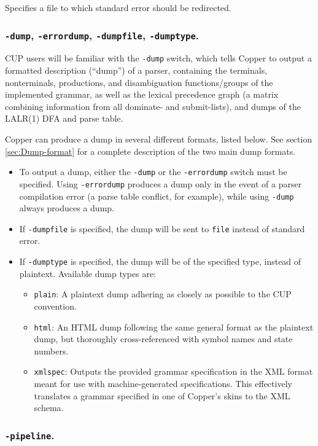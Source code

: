 \documentclass[12pt,english,twoside]{report}
\begin{document}
Specifies a file to which standard error should be redirected.

\subsubsection{\texttt{-dump}, \texttt{-errordump}, \texttt{-dumpfile}, \texttt{-dumptype}.}

CUP users will be familiar with the \texttt{-dump} switch, which tells
Copper to output a formatted description (``dump'') of a parser,
containing the terminals, nonterminals, productions, and
disambiguation functions/groups of the implemented grammar, as well as
the lexical precedence graph (a matrix combining information from all
dominate- and submit-lists), and dumps of the LALR(1) DFA and parse
table.

Copper can produce a dump in several different formats, listed below.
See section \ref{sec:Dump-format} for a complete description of the
two main dump formats.

\begin{itemize}
\item To output a dump, either the \texttt{-dump} or the
  \texttt{-errordump} switch must be specified. Using
  \texttt{-errordump} produces a dump only in the event of a parser
  compilation error (a parse table conflict, for example), while using
  \texttt{-dump} always produces a dump.
\item If \texttt{-dumpfile} is specified, the dump will be sent to
  \texttt{file} instead of standard error.
\item If \texttt{-dumptype} is specified, the dump will be of the
  specified type, instead of plaintext. Available dump types are:
\begin{itemize}
\item \texttt{plain}: A plaintext dump adhering as closely as possible to the CUP convention.
\item \texttt{html}: An HTML dump following the same general format as the plaintext dump, but thoroughly cross-referenced with symbol names and state numbers.
\item \texttt{xmlspec}: Outputs the provided grammar specification in the XML format meant for use with machine-generated specifications. This effectively translates a grammar specified in one of Copper's skins to the XML schema.
\end{itemize}
\end{itemize}

\subsubsection{\texttt{-pipeline}.}
\end{document}
